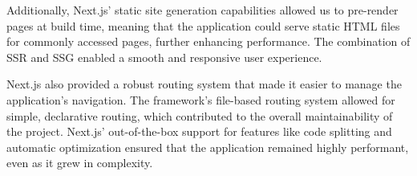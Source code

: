 \begin{enumerate}
    Additionally, Next.js’ static site generation capabilities allowed us to pre-render pages at build time, meaning that the application could serve static HTML files for commonly accessed pages, further enhancing performance. The combination of SSR and SSG enabled a smooth and responsive user experience.

    Next.js also provided a robust routing system that made it easier to manage the application’s navigation. The framework’s file-based routing system allowed for simple, declarative routing, which contributed to the overall maintainability of the project. Next.js’ out-of-the-box support for features like code splitting and automatic optimization ensured that the application remained highly performant, even as it grew in complexity. \\


\end{enumerate}